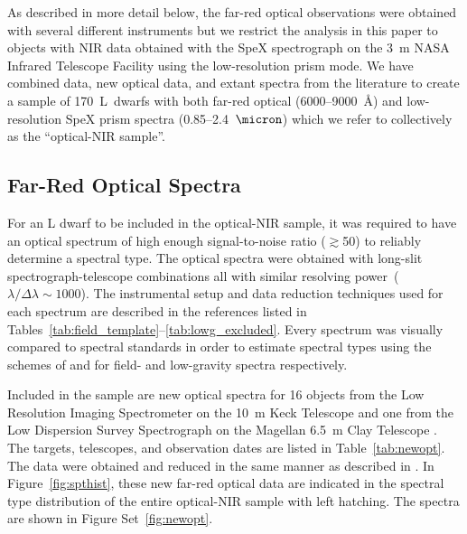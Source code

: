 \documentclass[modern,trackchanges]{aastex61}
\newcommand{\sample}{170}
\begin{document}
As described in more detail below, the far-red optical observations were obtained with several different instruments but we restrict the analysis in this paper to objects with NIR data obtained with the SpeX spectrograph \citep{Spex} on the 3~m NASA Infrared Telescope Facility using the low-resolution prism mode.
We have combined  data, new optical data, and extant spectra from the literature to create a sample of \sample~L~dwarfs with both far-red optical (6000--9000~\AA) and low-resolution SpeX prism spectra (0.85--2.4~$\micron$) which we refer to collectively as the ``optical-NIR sample''.

\subsection{Far-Red Optical Spectra}
\label{sec:obs_new_opt}

For an L dwarf to be included in the optical-NIR sample, it was required to have an optical spectrum of high enough signal-to-noise ratio ($\gtrsim$50) to reliably determine a spectral type.
The optical spectra were obtained with long-slit spectrograph-telescope combinations all with similar resolving power~($\lambda/\Delta\lambda\sim1000$).
The instrumental setup and data reduction techniques used for each spectrum are described in the references listed in Tables~\ref{tab:field_template}--\ref{tab:lowg_excluded}.
Every spectrum was visually compared to spectral standards in order to estimate spectral types using the schemes of \citet{K99} and \cite{Cruz09_lowg} for field- and low-gravity spectra respectively.

Included in the sample are new optical spectra for 16 objects from the Low Resolution Imaging Spectrometer on the 10~m Keck Telescope \citep[LRIS]{LRIS} and one from the Low Dispersion Survey Spectrograph on the Magellan 6.5~m Clay Telescope \citep[LDSS-3]{LDSS2}.
The targets, telescopes, and observation dates are listed in Table~\ref{tab:newopt}.
The data were obtained and reduced in the same manner as described in \citet{Kirkpatrick10}.
In Figure~\ref{fig:spthist}, these new far-red optical data are indicated in the spectral type distribution of the entire optical-NIR sample with left hatching.
The spectra are shown in Figure Set~\ref{fig:newopt}.

\figsetstart
{}

\figsetgrpstart
{}
\figsetgrpend
\end{document}
